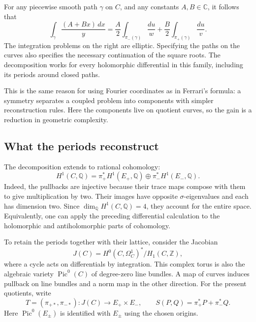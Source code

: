 \documentclass[11pt]{article}
\theoremstyle{remark}
\newcommand{\Q}{\mathbb Q}
\newcommand{\C}{\mathbb C}
\begin{document}
For any piecewise smooth path \(\gamma\) on \(C\), and any constants \(A,B\in\C\), it follows that
\begin{equation}
\boxed{
\int_\gamma\frac{(A+Bx)\,dx}{y}
=\frac A2\int_{\pi_-(\gamma)}\frac{du}{w}
+\frac B2\int_{\pi_+(\gamma)}\frac{du}{v}.}
\label{geometry:integral-splitting}
\end{equation}
The integration problems on the right are elliptic. Specifying the paths on the curves also specifies the necessary continuation of the square roots. The decomposition works for every holomorphic differential in this family, including its periods around closed paths.

This is the same reason for using Fourier coordinates as in Ferrari's formula: a symmetry separates a coupled problem into components with simpler reconstruction rules. Here the components live on quotient curves, so the gain is a reduction in geometric complexity.

\subsection{What the periods reconstruct}

The decomposition extends to rational cohomology:
\begin{equation}
H^1(C,\Q)
=\pi_+^*H^1(E_+,\Q)\oplus\pi_-^*H^1(E_-,\Q).
\label{geometry:h1-splitting}
\end{equation}
Indeed, the pullbacks are injective because their trace maps compose with them to give multiplication by two. Their images have opposite \(\sigma\)-eigenvalues and each has dimension two. Since \(\dim_\Q H^1(C,\Q)=4\), they account for the entire space. Equivalently, one can apply the preceding differential calculation to the holomorphic and antiholomorphic parts of cohomology.

To retain the periods together with their lattice, consider the Jacobian
\[
J(C)=H^0(C,\Omega_C^1)^*/H_1(C,\mathbb Z),
\]
where a cycle acts on differentials by integration. This complex torus is also the algebraic variety \(\operatorname{Pic}^0(C)\) of degree-zero line bundles. A map of curves induces pullback on line bundles and a norm map in the other direction. For the present quotients, write
\[
T=(\pi_{+*},\pi_{-*}):J(C)\longrightarrow E_+\times E_- ,
\qquad
S(P,Q)=\pi_+^*P+\pi_-^*Q.
\]
Here \(\operatorname{Pic}^0(E_\pm)\) is identified with \(E_\pm\) using the chosen origins.
\end{document}
